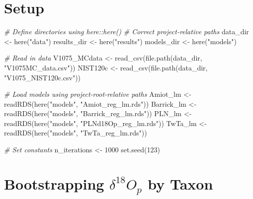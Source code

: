 \documentclass[
]{article}
\newenvironment{Shaded}{\begin{snugshade}}{\end{snugshade}}
\newcommand{\CommentTok}[1]{\textcolor[rgb]{0.56,0.35,0.01}{\textit{#1}}}
\newcommand{\DecValTok}[1]{\textcolor[rgb]{0.00,0.00,0.81}{#1}}
\newcommand{\FunctionTok}[1]{\textcolor[rgb]{0.00,0.00,0.00}{#1}}
\newcommand{\NormalTok}[1]{#1}
\newcommand{\OtherTok}[1]{\textcolor[rgb]{0.56,0.35,0.01}{#1}}
\newcommand{\StringTok}[1]{\textcolor[rgb]{0.31,0.60,0.02}{#1}}
\begin{document}
\hypertarget{setup}{%
\section{Setup}\label{setup}}

\begin{Shaded}
\begin{Highlighting}[]
\CommentTok{\# Define directories using here::here()}
\CommentTok{\# Correct project{-}relative paths}
\NormalTok{data\_dir }\OtherTok{\textless{}{-}} \FunctionTok{here}\NormalTok{(}\StringTok{"data"}\NormalTok{)}
\NormalTok{results\_dir }\OtherTok{\textless{}{-}} \FunctionTok{here}\NormalTok{(}\StringTok{"results"}\NormalTok{)}
\NormalTok{models\_dir }\OtherTok{\textless{}{-}} \FunctionTok{here}\NormalTok{(}\StringTok{"models"}\NormalTok{)}

\CommentTok{\# Read in data}
\NormalTok{V1075\_MCdata }\OtherTok{\textless{}{-}} \FunctionTok{read\_csv}\NormalTok{(}\FunctionTok{file.path}\NormalTok{(data\_dir, }\StringTok{"V1075MC\_data.csv"}\NormalTok{))}
\NormalTok{NIST120c }\OtherTok{\textless{}{-}} \FunctionTok{read\_csv}\NormalTok{(}\FunctionTok{file.path}\NormalTok{(data\_dir, }\StringTok{"V1075\_NIST120c.csv"}\NormalTok{))}

\CommentTok{\# Load models using project{-}root{-}relative paths}
\NormalTok{Amiot\_lm }\OtherTok{\textless{}{-}} \FunctionTok{readRDS}\NormalTok{(}\FunctionTok{here}\NormalTok{(}\StringTok{"models"}\NormalTok{, }\StringTok{"Amiot\_reg\_lm.rds"}\NormalTok{))}
\NormalTok{Barrick\_lm }\OtherTok{\textless{}{-}} \FunctionTok{readRDS}\NormalTok{(}\FunctionTok{here}\NormalTok{(}\StringTok{"models"}\NormalTok{, }\StringTok{"Barrick\_reg\_lm.rds"}\NormalTok{))}
\NormalTok{PLN\_lm }\OtherTok{\textless{}{-}} \FunctionTok{readRDS}\NormalTok{(}\FunctionTok{here}\NormalTok{(}\StringTok{"models"}\NormalTok{, }\StringTok{"PLNd18Op\_reg\_lm.rds"}\NormalTok{))}
\NormalTok{TwTa\_lm }\OtherTok{\textless{}{-}} \FunctionTok{readRDS}\NormalTok{(}\FunctionTok{here}\NormalTok{(}\StringTok{"models"}\NormalTok{, }\StringTok{"TwTa\_reg\_lm.rds"}\NormalTok{))}

\CommentTok{\# Set constants}
\NormalTok{n\_iterations }\OtherTok{\textless{}{-}} \DecValTok{1000}
\FunctionTok{set.seed}\NormalTok{(}\DecValTok{123}\NormalTok{)}
\end{Highlighting}
\end{Shaded}

\hypertarget{bootstrapping}{%
\section{\texorpdfstring{Bootstrapping \(\delta^{18}O_{p}\) by
Taxon}{Bootstrapping \textbackslash delta\^{}\{18\}O\_\{p\} by Taxon}}\label{bootstrapping}}
\end{document}
